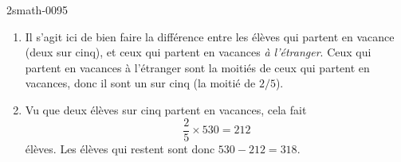 
\begin{corrige}{2smath-0095}

    \begin{enumerate}
        \item
            Il s'agit ici de bien faire la différence entre les élèves qui partent en vacance (deux sur cinq), et ceux qui partent en vacances \emph{à l'étranger}. Ceux qui partent en vacances à l'étranger sont la moitiés de ceux qui partent en vacances, donc il sont un sur cinq (la moitié de \( 2/5\)).
        \item
            Vu que deux élèves sur cinq partent en vacances, cela fait
            \begin{equation}
                \frac{ 2 }{ 5 }\times 530=212 
            \end{equation}
            élèves. Les élèves qui restent sont donc \( 530-212=318\).
    \end{enumerate}
\end{corrige}
